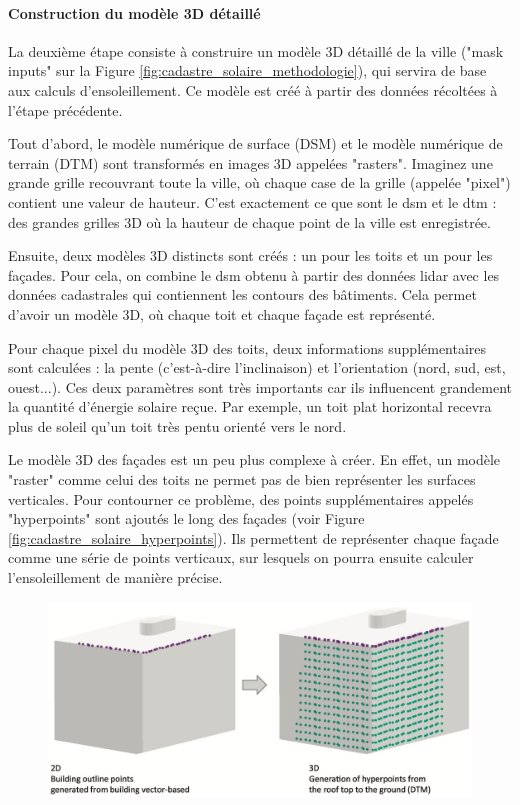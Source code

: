 {\paragraph{Construction du modèle 3D détaillé}
\par{La deuxième étape consiste à construire un modèle 3D détaillé de la ville ("mask inputs" sur la Figure \ref{fig:cadastre_solaire_methodologie}), qui servira de base aux calculs d'ensoleillement. Ce modèle est créé à partir des données récoltées à l'étape précédente.}
\par{Tout d'abord, le modèle numérique de surface (DSM) et le modèle numérique de terrain (DTM) sont transformés en images 3D appelées "rasters". Imaginez une grande grille recouvrant toute la ville, où chaque case de la grille (appelée "pixel") contient une valeur de hauteur. C'est exactement ce que sont le \acrshort{dsm} et le \acrshort{dtm} : des grandes grilles 3D où la hauteur de chaque point de la ville est enregistrée.}
\par{Ensuite, deux modèles 3D distincts sont créés : un pour les toits et un pour les façades. Pour cela, on combine le \acrshort{dsm} obtenu à partir des données \gls{lidar} avec les données cadastrales qui contiennent les contours des bâtiments. Cela permet d'avoir un modèle 3D, où chaque toit et chaque façade est représenté.}
\par{Pour chaque pixel du modèle 3D des toits, deux informations supplémentaires sont calculées : la pente (c'est-à-dire l'inclinaison) et l'orientation (nord, sud, est, ouest...). Ces deux paramètres sont très importants car ils influencent grandement la quantité d'énergie solaire reçue. Par exemple, un toit plat horizontal recevra plus de soleil qu'un toit très pentu orienté vers le nord.}
\par{Le modèle 3D des façades est un peu plus complexe à créer. En effet, un modèle "raster" comme celui des toits ne permet pas de bien représenter les surfaces verticales. Pour contourner ce problème, des points supplémentaires appelés "hyperpoints" sont ajoutés le long des façades (voir Figure \ref{fig:cadastre_solaire_hyperpoints}). Ils permettent de représenter chaque façade comme une série de points verticaux, sur lesquels on pourra ensuite calculer l'ensoleillement de manière précise.}
\begin{figure}[H]
    \centering
    \includegraphics[width=1\linewidth]{02-main//figures/cadastre_solaire_hyperpoints.png}

\end{figure}}
